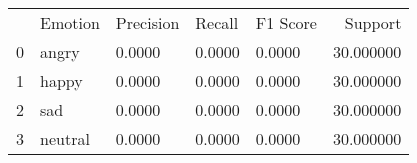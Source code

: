 \begin{tabular}{lllllr}
 & Emotion & Precision & Recall & F1 Score & Support \\
0 & angry & 0.0000 & 0.0000 & 0.0000 & 30.000000 \\
1 & happy & 0.0000 & 0.0000 & 0.0000 & 30.000000 \\
2 & sad & 0.0000 & 0.0000 & 0.0000 & 30.000000 \\
3 & neutral & 0.0000 & 0.0000 & 0.0000 & 30.000000 \\
\end{tabular}
